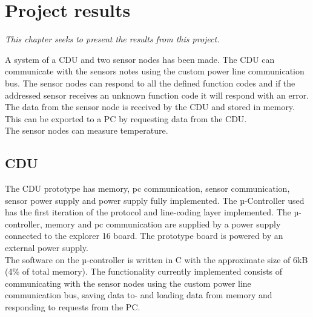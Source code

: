 \chapter{Project results}
\textit{This chapter seeks to present the results from this project.}

A system of a CDU and two sensor nodes has been made. The CDU can communicate with the sensors notes using the custom power line communication bus. The sensor nodes can respond to all the defined function codes and if the addressed sensor receives an unknown function code it will respond with an error.\\
The data from the sensor node is received by the CDU and stored in memory. This can be exported to a PC by requesting data from the CDU.\\
The sensor nodes can measure temperature.
\section{CDU}
The CDU prototype has memory, pc communication, sensor communication, sensor power supply and power supply fully implemented. The µ-Controller used has the first iteration of the protocol and line-coding layer implemented. The µ-controller, memory and pc communication are supplied by a power supply connected to the explorer 16 board. The prototype board is powered by an external power supply.\\
The software on the µ-controller is written in C with the approximate size of 6kB (4\% of total memory). The functionality currently implemented consists of communicating with the sensor nodes using the custom power line communication bus, saving data to- and loading data from memory and responding to requests from the PC.

